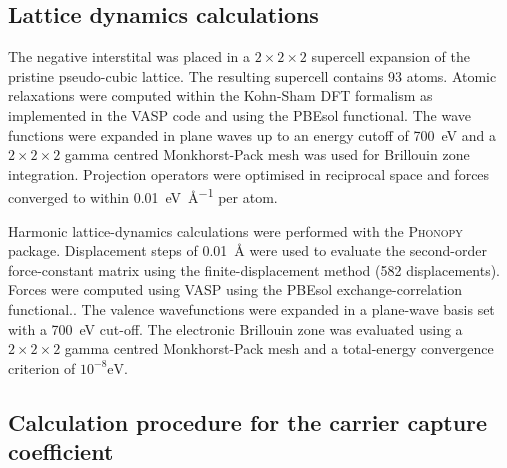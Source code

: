 
\subsection{Lattice dynamics calculations}

The negative interstital was placed in a $2\!\times\!2\!\times\!2$ supercell expansion of the pristine pseudo-cubic lattice. The resulting supercell contains 93 atoms. Atomic relaxations were computed within the Kohn-Sham DFT formalism as implemented in the \textsc{VASP} code\autocite{Kresse1996a} and using the PBEsol functional. The wave functions were expanded in plane waves up to an energy cutoff of \SI{700}{\electronvolt} and a $2\! \times\! 2\! \times\! 2$ gamma centred Monkhorst-Pack mesh was used for Brillouin zone integration.  Projection operators were optimised in reciprocal space and forces converged to within \SI{0.01}{\electronvolt\per\angstrom} per atom.

Harmonic lattice-dynamics calculations were performed with the \textsc{Phonopy} package.\autocite{Togo2015} Displacement steps of \SI{0.01}{\angstrom} were used to evaluate the second-order force-constant matrix using the finite-displacement method (582 displacements).
Forces were computed using \textsc{VASP} using the PBEsol exchange-correlation functional.\autocite{Perdew2008a}.
The valence wavefunctions were expanded in a plane-wave basis set with a \SI{700}{\electronvolt} cut-off. The electronic Brillouin zone was evaluated using a $2\!\times\!2\!\times\!2$ gamma centred Monkhorst-Pack mesh and a total-energy convergence criterion of $10^{-8}\textrm{eV}$.

\subsection{Calculation procedure for the carrier capture coefficient}

